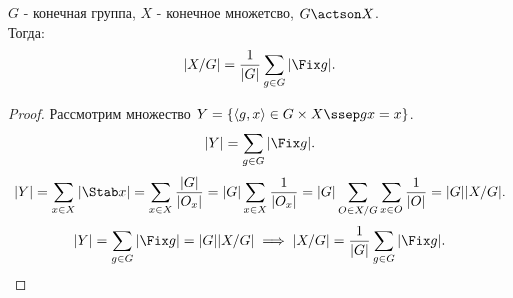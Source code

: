 \documentclass[11pt, oneside]{article}   	%
\begin{document}
    \begin{dlemma}
       $G$ - конечная группа,  $X$ - конечное множетсво,  $G\actson X$.\\
       Тогда:
       \[ |X / G| = \frac{1}{|G|}\sum\limits_{g\in G} |\Fix g|.\]
       \begin{proof}
          Рассмотрим множество $Y = \{\left<g, x\right>\in G \times X\ssep gx=x\} $.\\
          \[ |Y| = \sum\limits_{g\in G} |\Fix g| .\]
          \[ |Y| = \sum\limits_{x\in X} |\Stab x| = \sum\limits_{x\in X} \frac{|G|}{|O_x|} = |G|\sum\limits_{x\in X} \frac{1}{|O_x|} = |G| \sum\limits_{O\in X / G} \sum\limits_{x\in O} \frac{1}{|O|} = |G| |X / G|.\]
          \[ |Y| = \sum\limits_{g\in G}|\Fix g| = |G| |X / G| \implies |X / G| = \frac{1}{|G|} \sum\limits_{g\in G} |\Fix g| .\qedhere\] 
       \end{proof}
    \end{dlemma}
\end{document}
